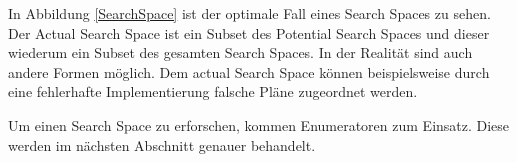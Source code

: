 In Abbildung \ref{SearchSpace} ist der optimale Fall eines Search Spaces zu sehen. Der Actual Search Space ist ein Subset des Potential Search Spaces und dieser wiederum ein Subset des gesamten Search Spaces. In der Realität sind auch andere Formen möglich. Dem actual Search Space können beispielsweise durch eine fehlerhafte Implementierung falsche Pläne zugeordnet werden.

Um einen Search Space zu erforschen,  kommen Enumeratoren zum Einsatz. Diese werden im nächsten Abschnitt genauer behandelt.